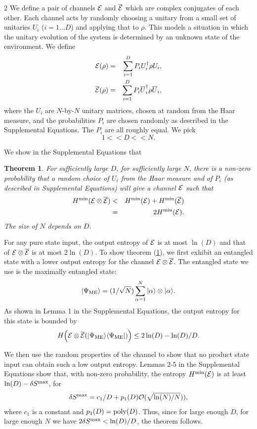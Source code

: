 \documentclass[aps,prl,amsmath,amssymb,amsfonts,superscriptaddress,floatfix]{revtex4}
\newtheorem{theorem}{Theorem}
\newcommand{\ME}{\Psi_{\rm ME}}
\newcommand{\dSm}{\delta S^{\rm max}}
\newcommand{\be}{\begin{equation}}
\newcommand{\ee}{\end{equation}}
\begin{document}
\begin{multicols}{2}
We define a pair of channels ${\cal E}$ and $\overline {\cal E}$ which
are complex conjugates of each other.  Each channel
acts by randomly choosing a unitary from a small set of unitaries $U_i$
($i=1...D$) and applying that to $\rho$.  This models a situation
in which the unitary evolution of the system
is determined by an unknown state of the environment.
We define
\begin{eqnarray}
{\cal E}(\rho)&=&
\sum_{i=1}^D 
P_i U^{\dagger}_i \rho U_i,
\\ \nonumber
\overline {\cal E}(\rho)&=&
\sum_{i=1}^D 
P_i \overline U^{\dagger}_i \rho \overline U_i,
\end{eqnarray}
where the $U_i$ are $N$-by-$N$ unitary matrices, chosen at
random from the Haar measure, and the probabilities
$P_i$ are chosen randomly as described
in the Supplemental Equations.  The $P_i$ are all roughly equal.
We pick
\be
1<<D<<N.
\ee

We show in the Supplemental Equations that
\begin{theorem}
\label{mainthm}
For sufficiently large $D$, for sufficiently large $N$, there is a non-zero probability
that a random choice of $U_i$ from the Haar measure and of $P_i$ (as
described in Supplemental Equations) will
give a channel ${\cal E}$ such that
\begin{eqnarray}
H^{\rm min}({\cal E}\otimes \overline {\cal E})&<&
H^{\rm min}({\cal E})+ H^{\rm min}(\overline {\cal E})
\\ \nonumber
&=& 2 H^{\rm min}({\cal E}).
\end{eqnarray}
The size of $N$ depends on $D$.
\end{theorem}

For any pure state input,
the output entropy of ${\cal E}$ is at most $\ln(D)$
and that of ${\cal E} \otimes \overline {\cal E}$ is
at most $2\ln(D)$.
To show theorem (\ref{mainthm}), we first
exhibit an entangled state with a lower output entropy for the channel
${\cal E} \otimes \overline {\cal E}$.
The entangled state we use is the
maximally entangled state:
\be
|\ME\rangle=(1/\sqrt{N})\sum_{\alpha=1}^N |\alpha\rangle\otimes|\alpha\rangle.
\ee
As shown in Lemma 1 in the Supplemental Equations, the output entropy
for this state is bounded by
\be
\label{noD}
H\Bigl({\cal E}\otimes \overline {\cal E}(|\ME\rangle\langle\ME|)\Bigr)
\leq
2\ln(D)-\ln(D)/D.
\ee
  
We then use the random properties of the channel
to show that no product state input can obtain such a low output entropy.
Lemmas 2-5 in the
Supplemental Equations show that, with non-zero probability, the
entropy
$H^{\rm min}({\cal E})$ is at least 
$\ln(D)-\dSm$, for
\be
\label{dsm}
\dSm=c_1/D
+p_1(D){\cal O}(\sqrt{\ln(N)/N})),
\ee
where $c_1$ is a constant and $p_1(D)={\rm poly}(D)$.
Thus, since for large enough $D$, for large enough $N$ we have
$2\dSm< \ln(D)/D$, the theorem follows.


\end{multicols}
\end{document}
